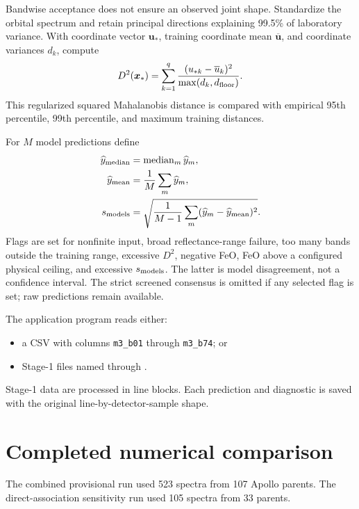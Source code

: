 \documentclass[11pt]{article}
\begin{document}
Bandwise acceptance does not ensure an observed joint shape. Standardize the orbital spectrum and retain principal directions explaining 99.5\% of laboratory variance. With coordinate vector $\bm u_*$, training coordinate mean $\overline{\bm u}$, and coordinate variances $d_k$, compute
\begin{equation}
 D^2(\bm x_*)=\sum_{k=1}^{q}
 \frac{(u_{*k}-\overline u_k)^2}{\max(d_k,d_{\rm floor})}.
\end{equation}
This regularized squared Mahalanobis distance is compared with empirical 95th percentile, 99th percentile, and maximum training distances.

For $M$ model predictions define
\begin{align}
 \widehat y_{\rm median}&=\operatorname{median}_m\widehat y_m,\\
 \widehat y_{\rm mean}&=\frac1M\sum_m\widehat y_m,\\
 s_{\rm models}&=\sqrt{\frac1{M-1}\sum_m(\widehat y_m-\widehat y_{\rm mean})^2}.
\end{align}
Flags are set for nonfinite input, broad reflectance-range failure, too many bands outside the training range, excessive $D^2$, negative FeO, FeO above a configured physical ceiling, and excessive $s_{\rm models}$. The latter is model disagreement, not a confidence interval. The strict screened consensus is omitted if any selected flag is set; raw predictions remain available.

The application program reads either:
\begin{itemize}
 \item a CSV with columns \texttt{m3\_b01} through \texttt{m3\_b74}; or
 \item Stage-1 files named  through
 .
\end{itemize}
Stage-1 data are processed in line blocks. Each prediction and diagnostic is saved with the original line-by-detector-sample shape.

\section{Completed numerical comparison}
The combined provisional run used 523 spectra from 107 Apollo parents. The direct-association sensitivity run used 105 spectra from 33 parents.
\end{document}

